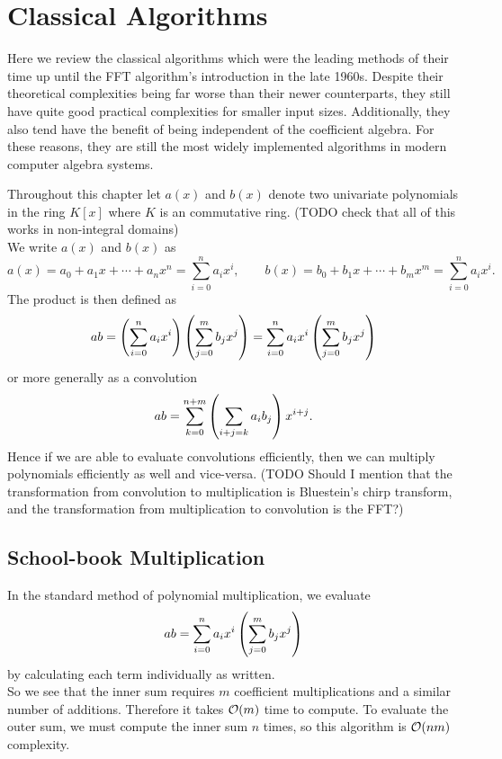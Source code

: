 \chapter{Classical Algorithms}\label{chp:classical}

Here we review the classical algorithms which were the leading methods of their time up until the FFT algorithm's introduction in the late 1960s. Despite their theoretical complexities being far worse than their newer counterparts, they still have quite good practical complexities for smaller input sizes. Additionally, they also tend have the benefit of being independent of the coefficient algebra. For these reasons, they are still the most widely implemented algorithms in modern computer algebra systems. 

Throughout this chapter let $a(x)$ and $b(x)$ denote two univariate polynomials in the ring $K[x]$ where $K$ is an commutative ring. (TODO check that all of this works in non-integral domains)\\
We write $a(x)$ and $b(x)$ as
\[
    a(x) = a_0 + a_1x + \cdots + a_nx^n = \sum^n_{i=0} a_ix^i, \qquad b(x) = b_0 + b_1x + \cdots + b_mx^m = \sum^n_{i=0} a_ix^i.
\]
The product is then defined as
\[
    ab = \left(\sum^n_{i=0} a_i x^i\right)\left(\sum^m_{j=0} b_j x^j\right) = \sum^n_{i=0} a_ix^i\left(\sum^m_{j=0} b_j x^j\right)
\]
or more generally as a convolution
\[
    ab = \sum^{n + m}_{k=0} \left(\sum_{i + j = k}a_ib_j\right) x^{i + j}.
\]
Hence if we are able to evaluate convolutions efficiently, then we can multiply polynomials efficiently as well and vice-versa.
(TODO Should I mention that the transformation from convolution to multiplication is Bluestein's chirp transform, and the transformation from multiplication to convolution is the FFT?)

\section{School-book Multiplication}
\label{sec:prelim-schoolbook}

In the standard method of polynomial multiplication, we evaluate
\[
    ab = \sum^n_{i=0} a_ix^i\left(\sum^m_{j=0} b_j x^j\right)
\]
by calculating each term individually as written.\\
So we see that the inner sum requires $m$ coefficient multiplications and a similar number of additions. Therefore it takes $\mathcal O(m)$ time to compute. To evaluate the outer sum, we must compute the inner sum $n$ times, so this algorithm is $\mathcal O(nm)$ complexity.

